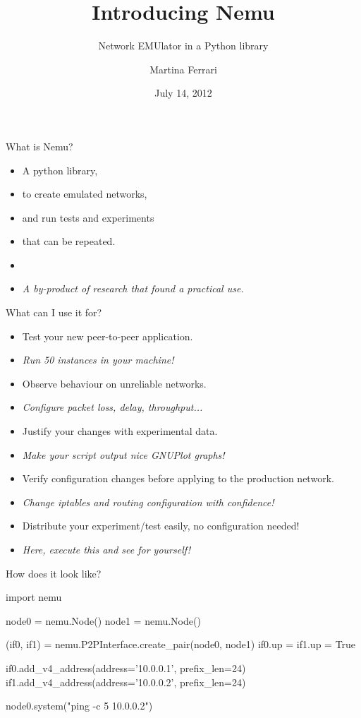 \documentclass{beamer}
\title{Introducing Nemu}
\subtitle{Network EMUlator in a \hsout{box} Python library}
\author{Martina Ferrari}
\institute[DebConf 12]{\pgfuseimage{debian-logo-big}}
\date{July 14, 2012}
\begin{document}
\begin{frame}
  \titlepage
\end{frame}

\begin{frame}{What is Nemu?}
  \begin{itemize}
  \item A \alert{python} library,
  \item to create \alert{emulated networks},
  \item and run \alert{tests and experiments}
  \item that can be \alert{repeated}.
  \item[]{}
  \item[] \em{A by-product of research that found a practical use.}
  \end{itemize}
\end{frame}

\begin{frame}{What can I use it for?}
  \begin{itemize}
  \item Test your new peer-to-peer application.
  \item[] \small{\em{Run 50 instances in your machine!}}
  \vfill
  \item Observe behaviour on unreliable networks.
  \item[] \small{\em{Configure packet loss, delay, throughput...}}
  \vfill
  \item Justify your changes with experimental data.
  \item[] \small{\em{Make your script output nice GNUPlot graphs!}}
  \vfill
  \item Verify configuration changes before applying to the production network.
  \item[] \small{\em{Change iptables and routing configuration with
  confidence!}}
  \vfill
  \item Distribute your experiment/test easily, no configuration needed!
  \item[] \small{\em{Here, execute this and see for yourself!}}
  \end{itemize}
\end{frame}

\begin{frame}[fragile]{How does it look like?}
\begin{semiverbatim}
import nemu

node0 = nemu.Node()
node1 = nemu.Node()

(if0, if1) = nemu.P2PInterface.create_pair(node0, node1)
if0.up = if1.up = True

if0.add_v4_address(address='10.0.0.1', prefix_len=24)
if1.add_v4_address(address='10.0.0.2', prefix_len=24)

node0.system("ping -c 5 10.0.0.2")
\end{semiverbatim}
\end{frame}
\end{document}
